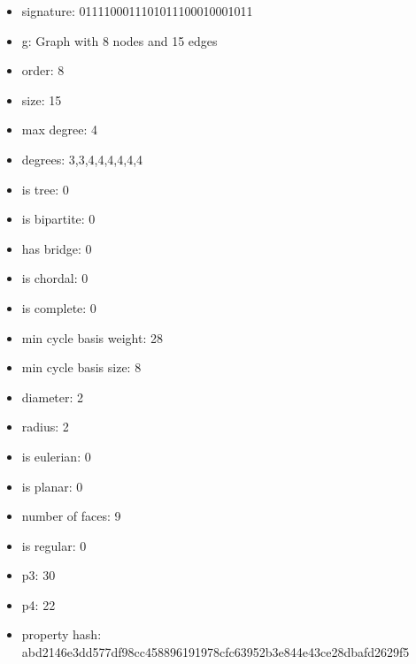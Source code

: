 \begin{itemize}
\item signature: 0111100011101011100010001011
\item g: Graph with 8 nodes and 15 edges
\item order: 8
\item size: 15
\item max degree: 4
\item degrees: 3,3,4,4,4,4,4,4
\item is tree: 0
\item is bipartite: 0
\item has bridge: 0
\item is chordal: 0
\item is complete: 0
\item min cycle basis weight: 28
\item min cycle basis size: 8
\item diameter: 2
\item radius: 2
\item is eulerian: 0
\item is planar: 0
\item number of faces: 9
\item is regular: 0
\item p3: 30
\item p4: 22
\item property hash: abd2146e3dd577df98cc458896191978cfc63952b3e844e43ce28dbafd2629f5
\end{itemize}
\newpage
\begin{figure}
\end{figure}
